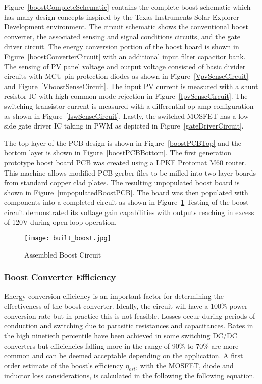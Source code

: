 Figure~\ref{boostCompleteSchematic} contains the complete boost schematic which has many design concepts inspired by the Texas Instruments Solar Explorer Development environment.\cite{tiAppReportControl} The circuit schematic shows the conventional boost converter, the associated sensing and signal conditions circuits, and the gate driver circuit. The energy conversion portion of the boost board is shown in Figure~\ref{boostConverterCircuit} with an additional input filter capacitor bank. The sensing of PV panel voltage and output voltage consisted of basic divider circuits with MCU pin protection diodes as shown in Figure~\ref{VpvSenseCircuit} and Figure~\ref{VboostSenseCircuit}. The input PV current is measured with a shunt resistor IC with high common-mode rejection in Figure~\ref{IpvSenseCircuit}. The switching transistor current is measured with a differential op-amp configuration as shown in Figure~\ref{IswSenseCircuit}. Lastly, the switched MOSFET has a low-side gate driver IC taking in PWM as depicted in Figure~\ref{gateDriverCircuit}. 

The top layer of the PCB design is shown in Figure~\ref{boostPCBTop} and the bottom layer is shown in Figure~\ref{boostPCBBottom}. The first generation prototype boost board PCB was created using a LPKF Protomat M60 router. This machine allows modified PCB gerber files to be milled into two-layer boards from standard copper clad plates. The resulting unpopulated boost board is shown in Figure~\ref{unpopulatedBoostPCB}. The board was then populated with components into a completed circuit as shown in Figure~\ref{Built Boost} Testing of the boost circuit demonstrated its voltage gain capabilities with outputs reaching in excess of 120V during open-loop operation.

\begin{figure}
\centering
\texttt{[image: built\_boost.jpg]}
\caption{Assembled Boost Circuit}
\label{Built Boost}
\end{figure}

\subsubsection{Boost Converter Efficiency}
Energy conversion efficiency is an important factor for determining the effectiveness of the boost converter. Ideally, the circuit will have a 100\% power conversion rate but in practice this is not feasible. Losses occur during periods of conduction and switching due to parasitic resistances and capacitances.  Rates in the high ninetieth percentile have been achieved in some switching DC/DC converters but efficiencies falling more in the range of 90\% to 70\% are more common and can be deemed acceptable depending on the application. A first order estimate of the boost's efficiency $\eta_{est}$, with the MOSFET, diode and inductor loss considerations, is calculated in the following the following equation.

